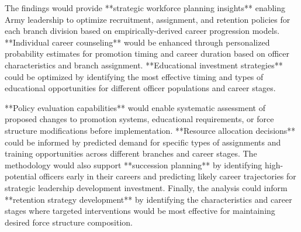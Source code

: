 \documentclass[main.tex]{subfiles}
\begin{document}
The findings would provide **strategic workforce planning insights** enabling Army leadership to optimize recruitment, assignment, and retention policies for each branch division based on empirically-derived career progression models. **Individual career counseling** would be enhanced through personalized probability estimates for promotion timing and career duration based on officer characteristics and branch assignment. **Educational investment strategies** could be optimized by identifying the most effective timing and types of educational opportunities for different officer populations and career stages.

**Policy evaluation capabilities** would enable systematic assessment of proposed changes to promotion systems, educational requirements, or force structure modifications before implementation. **Resource allocation decisions** could be informed by predicted demand for specific types of assignments and training opportunities across different branches and career stages. The methodology would also support **succession planning** by identifying high-potential officers early in their careers and predicting likely career trajectories for strategic leadership development investment. Finally, the analysis could inform **retention strategy development** by identifying the characteristics and career stages where targeted interventions would be most effective for maintaining desired force structure composition.
\end{document}
